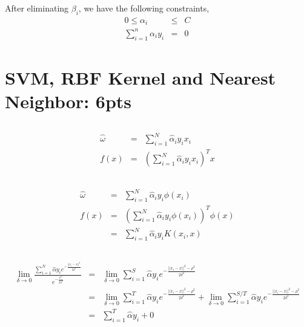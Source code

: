 \documentclass[12pt]{article}
\begin{document}
After eliminating $\beta_i$, we have the following constraints,
\begin{eqnarray}
    0 \leq \alpha_i &\leq& C \nonumber \\
    \sum_{i=1}^n \alpha_iy_i &=& 0 \nonumber
\end{eqnarray}

\newpage

\section{SVM, RBF Kernel and Nearest Neighbor: 6pts}
\subsection{}
\begin{eqnarray}
    \hat{\omega} &=& \sum_{i=1}^N \hat{\alpha}_iy_ix_i \nonumber\\
    f(x) &=& (\sum_{i=1}^N \hat{\alpha}_iy_ix_i)^T x \nonumber
\end{eqnarray}

\subsection{}
\begin{eqnarray}
    \hat{\omega} &=& \sum_{i=1}^N \hat{\alpha}_iy_i\phi(x_i) \nonumber \\
    f(x) &=& (\sum_{i=1}^N \hat{\alpha}_iy_i\phi(x_i))^T \phi(x) \nonumber \\ 
        &=& \sum_{i=1}^N \hat{\alpha}_iy_iK(x_i, x) \nonumber
\end{eqnarray}

\subsection{}
\begin{eqnarray}
    \lim_{\delta \to 0} \frac{\sum_{i=1}^{N}{\hat{\alpha}y_ie^{-\frac{||x_i-x||^{2}}{2\delta^{2}}}}}{e^{-\frac{\rho ^2}{2\delta^{2}}}}
    &=& \lim_{\delta \to 0} \sum_{i=1}^{S}{\hat{\alpha}y_ie^{-\frac{||x_i-x||^{2} - \rho ^2}{2\delta^{2}}}} \nonumber \\
    &=& \lim_{\delta \to 0} \sum_{i=1}^{T}{\hat{\alpha}y_ie^{-\frac{||x_i - x||^{2} - \rho^2}{2\delta^2}}} 
    +  \lim_{\delta \to 0} \sum_{i=1}^{S/T}{\hat{\alpha}y_ie^{-\frac{||x_i - x||^{2} - \rho^2}{2\delta^2}}} \nonumber \\
    &=& \sum_{i=1}^{T}{\hat{\alpha}y_i + 0} \nonumber 
\end{eqnarray}
\end{document}
